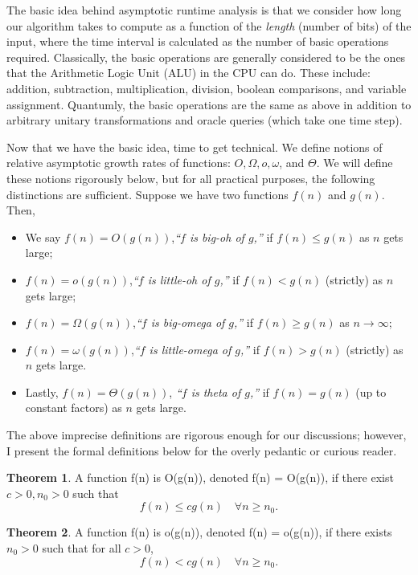 \documentclass[12pt,twoside]{reedthesis}
\theoremstyle{definition}
\newtheorem{theorem}{Theorem}[chapter]
\begin{document}
The basic idea behind asymptotic runtime analysis is that we consider how long our algorithm takes to compute as a function of the \textit{length} (number of bits) of the input, where the time interval is calculated as the number of basic operations required. Classically, the basic operations are generally considered to be the ones that the Arithmetic Logic Unit (ALU) in the CPU can do. These include: addition, subtraction, multiplication, division, boolean comparisons, and variable assignment. Quantumly, the basic operations are the same as above in addition to arbitrary unitary transformations and oracle queries (which take one time step). 

Now that we have the basic idea, time to get technical. We define notions of relative asymptotic growth rates of functions: $O, \Omega, o, \omega$, and $\Theta$. We will define these notions rigorously below, but for all practical purposes, the following distinctions are sufficient. Suppose we have two functions $f(n)$ and $g(n)$. Then, 
\begin{itemize}
\item We say $f(n) = O(g(n))$,\textit{``$f$ is big-oh of $g$,''} if $f(n) \leq g(n)$ as $n$ gets large;
\item $f(n) = o(g(n))$,\textit{``$f$ is little-oh of $g$,''} if $f(n) < g(n)$ (strictly) as $n$ gets large;
\item $f(n) = \Omega(g(n))$,\textit{``$f$ is big-omega of $g$,''} if $f(n) \geq g(n)$ as $n \rightarrow \infty$;
\item $f(n) = \omega(g(n))$,\textit{``$f$ is little-omega of $g$,''} if $f(n) > g(n)$ (strictly) as $n$ gets large.
\item Lastly, $f(n) = \Theta(g(n))$, \textit{``$f$ is theta of $g$,''} if $f(n) = g(n)$ (up to constant factors) as $n$ gets large.
\end{itemize}
The above imprecise definitions are rigorous enough for our discussions; however, I present the formal definitions below for the overly pedantic or curious reader. 
 
\begin{theorem}
A function f(n) is O(g(n)), denoted f(n) = O(g(n)), if there exist $c>0, n_0>0$ such that
$$f(n) \leq c g(n) \quad \forall n\geq n_0.$$
\end{theorem}

\begin{theorem}
A function f(n) is o(g(n)), denoted f(n) = o(g(n)), if there exists $n_0>0$ such that for all $c>0$,
$$f(n) < c g(n) \quad \forall n\geq n_0.$$
\end{theorem}
\end{document}
